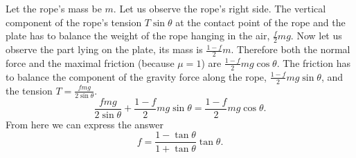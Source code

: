 \documentclass[11pt]{article}
\begin{document}

\solueng
Let the rope’s mass be $m$. Let us observe the rope’s right side. The vertical component of the rope’s tension $T \sin \theta$ at the contact point of the rope and the plate has to balance the weight of the rope hanging in the air, $\frac{f}{2}mg$. Now let us observe the part lying on the plate, its mass is $\frac{1-f}{2}m$. Therefore both the normal force and the maximal friction (because $\mu = 1$) are $\frac{1-f}{2}mg \cos \theta$. The friction has to balance the component of the gravity force along the rope, $\frac{1-f}{2}mg \sin \theta$, and the tension $T=\frac{f m g}{2 \sin \theta}$. 
$$\frac{f m g}{2 \sin \theta} + \frac{1-f}{2}mg \sin \theta = \frac{1-f}{2}mg \cos \theta.$$
From here we can express the answer
$$f = \frac{1-\tan \theta}{1+\tan \theta} \tan \theta. $$
\probend
\bigskip

\end{document}
